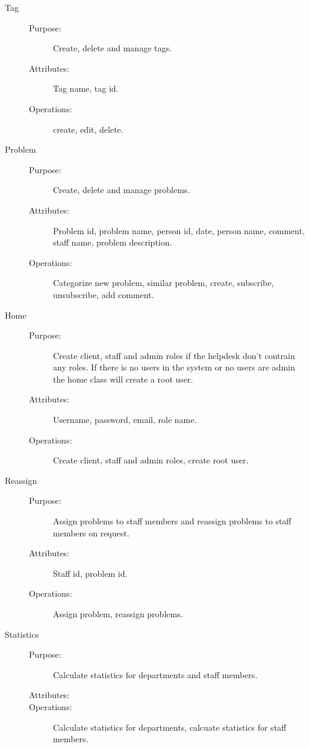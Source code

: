 \begin{description}
\item[Tag]\hfill
\begin{description}
\item[Purpose:]Create, delete and manage tags.
\item[Attributes:]Tag name, tag id.
\item[Operations:]create, edit, delete.
\end{description}
\end{description}

\begin{description}
\item[Problem]\hfill
\begin{description}
\item[Purpose:]Create, delete and manage problems.
\item[Attributes:]Problem id, problem name, person id, date, person name, comment, staff name, problem description.
\item[Operations:]Categorize new problem, similar problem, create, subscribe, unsubscribe, add comment.
\end{description}
\end{description}

\begin{description}
\item[Home]\hfill
\begin{description}
\item[Purpose:]Create client, staff and admin roles if the helpdesk don't contrain any roles. If there is no users in the system or no users are admin the home class will create a root user.
\item[Attributes:]Username, password, email, role name.
\item[Operations:]Create client, staff and admin roles, create root user.
\end{description}
\end{description}

\begin{description}
\item[Reassign]\hfill
\begin{description}
\item[Purpose:]Assign problems to staff members and reassign problems to staff members on request.
\item[Attributes:]Staff id, problem id.
\item[Operations:]Assign problem, reassign problems.
\end{description}
\end{description}

\begin{description}
\item[Statistics]\hfill
\begin{description}
\item[Purpose:]Calculate statistics for departments and staff members.
\item[Attributes:]
\item[Operations:]Calculate statistics for departments, calcuate statistics for staff members.
\end{description}
\end{description}